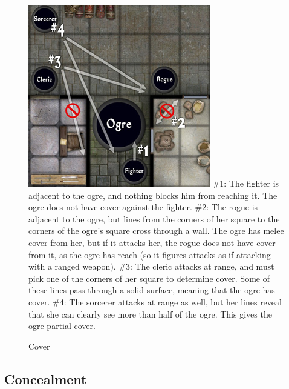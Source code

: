 \begin{figure}
\sffamily
\caption{Cover}
\includegraphics[width=\linewidth]{images/Cover.jpg}
\#1: The fighter is adjacent to the ogre, and nothing blocks him from reaching it. The ogre does not have cover against the fighter.\newline
\#2: The rogue is adjacent to the ogre, but lines from the corners of her square to the corners of the ogre's square cross through a wall. The ogre has melee cover from her, but if it attacks her, the rogue does not have cover from it, as the ogre has reach (so it figures attacks as if attacking with a ranged weapon).\newline
\#3: The cleric attacks at range, and must pick one of the corners of her square to determine cover. Some of these lines pass through a solid surface, meaning that the ogre has cover.\newline
\#4: The sorcerer attacks at range as well, but her lines reveal that she can clearly see more than half of the ogre. This gives the ogre partial cover.
\end{figure}

				
\subsection{Concealment}


